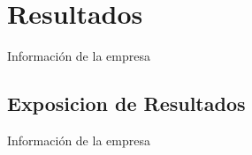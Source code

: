 \renewcommand{\thesection}{\Roman{section}}
\section{Resultados}

{\large Información de la empresa}\\

\renewcommand{\thesection}{\arabic{section}}
\subsection{Exposicion de Resultados}

{\large Información de la empresa}\\